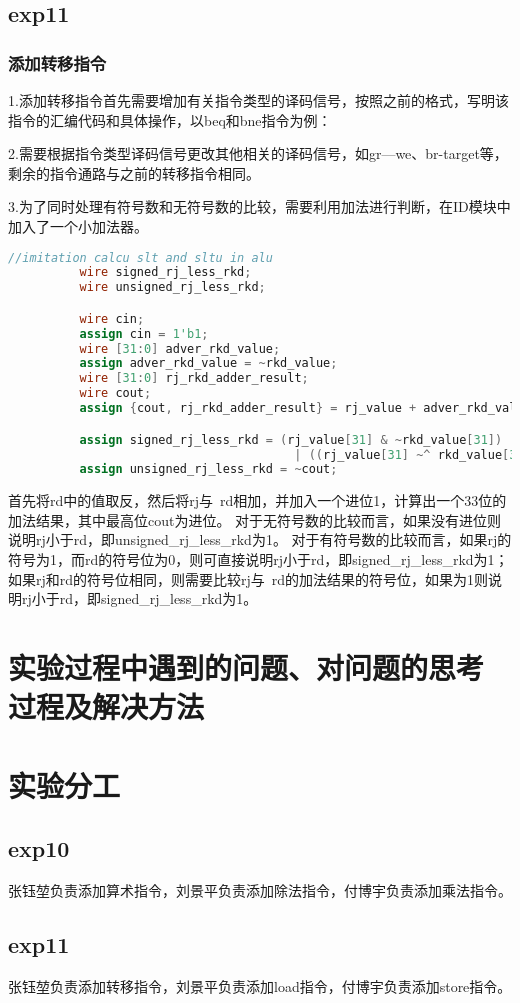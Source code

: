 \documentclass[12pt,a4paper]{article}
\newcommand*{\song}{\CJKfamily{zhsong}}
\newcommand{\sectionfont}{\song\textbf}
\begin{document}
    \subsection{exp11}
        \subsubsection{添加转移指令}
          1.添加转移指令首先需要增加有关指令类型的译码信号，按照之前的格式，写明该指令的汇编代码和具体操作，以beq和bne指令为例：
          \par
          2.需要根据指令类型译码信号更改其他相关的译码信号，如gr—we、br-target等，剩余的指令通路与之前的转移指令相同。
          \par
          3.为了同时处理有符号数和无符号数的比较，需要利用加法进行判断，在ID模块中加入了一个小加法器。
          \begin{lstlisting}[language=Verilog]
            //imitation calcu slt and sltu in alu
          wire signed_rj_less_rkd;
          wire unsigned_rj_less_rkd;

          wire cin;
          assign cin = 1'b1;
          wire [31:0] adver_rkd_value;
          assign adver_rkd_value = ~rkd_value;
          wire [31:0] rj_rkd_adder_result;
          wire cout;
          assign {cout, rj_rkd_adder_result} = rj_value + adver_rkd_value + cin;

          assign signed_rj_less_rkd = (rj_value[31] & ~rkd_value[31])
                                        | ((rj_value[31] ~^ rkd_value[31]) & rj_rkd_adder_result[31]);
          assign unsigned_rj_less_rkd = ~cout;  
          \end{lstlisting}
          首先将rd中的值取反，然后将rj与~rd相加，并加入一个进位1，计算出一个33位的加法结果，其中最高位cout为进位。
          对于无符号数的比较而言，如果没有进位则说明rj小于rd，即unsigned\_rj\_less\_rkd为1。
          对于有符号数的比较而言，如果rj的符号为1，而rd的符号位为0，则可直接说明rj小于rd，即signed\_rj\_less\_rkd为1；
          如果rj和rd的符号位相同，则需要比较rj与~rd的加法结果的符号位，如果为1则说明rj小于rd，即signed\_rj\_less\_rkd为1。

\section{\sectionfont 实验过程中遇到的问题、对问题的思考过程及解决方法}

\section{\sectionfont 实验分工}
    \subsection{exp10}
        张钰堃负责添加算术指令，刘景平负责添加除法指令，付博宇负责添加乘法指令。
    \subsection{exp11}
        张钰堃负责添加转移指令，刘景平负责添加load指令，付博宇负责添加store指令。
\end{document}
